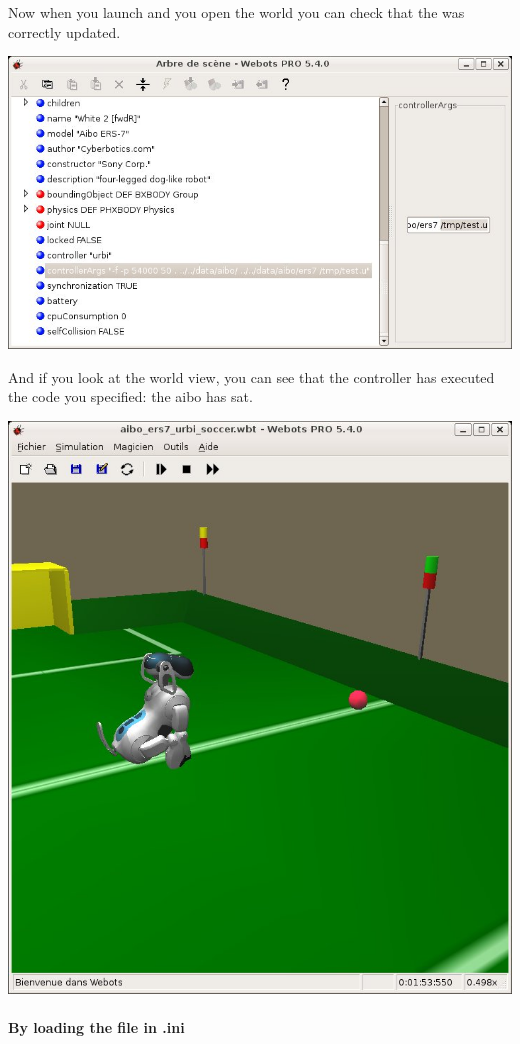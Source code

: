 Now when you launch \webots and you open the world
 you can check that the
 was correctly updated.

\begin{center}
  \includegraphics[width=.8\linewidth]{img/webots/scene-tree-add-loaded-file}
\end{center}

And if you look at the world view, you can see that the controller has
executed the \urbi code you specified: the aibo has sat.

\begin{center}
  \includegraphics[width=.8\linewidth]{img/webots/aibo-sat}
\end{center}



\paragraph{By loading the file in \urbi.ini}

